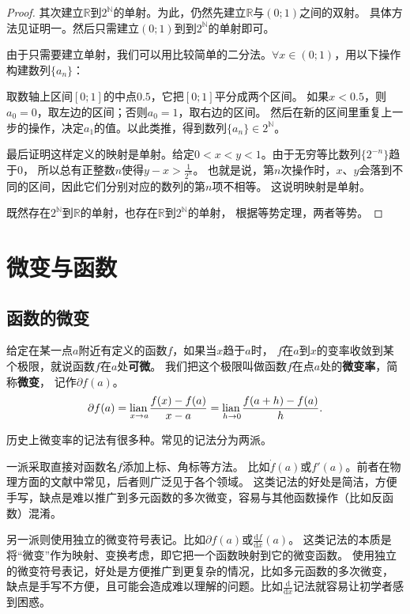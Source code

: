 \documentclass[12pt,UTF8]{ctexbook}
\begin{document}
\begin{appendix}
\begin{proof}
    其次建立$\mathbb{R}$到$2^\mathbb{N}$的单射。为此，仍然先建立$\mathbb{R}$与$(0;1)$之间的双射。
    具体方法见证明一。然后只需建立$(0;1)$到到$2^\mathbb{N}$的单射即可。

    由于只需要建立单射，我们可以用比较简单的二分法。$\forall x \in (0;1)$，用以下操作构建数列$\{a_n\}$：
    
    取数轴上区间$[0;1]$的中点$0.5$，它把$[0;1]$平分成两个区间。
    如果$x<0.5$，则$a_0=0$，取左边的区间；否则$a_0=1$，取右边的区间。
    然后在新的区间里重复上一步的操作，决定$a_1$的值。以此类推，得到数列$\{a_n\}\in 2^\mathbb{N}$。

    最后证明这样定义的映射是单射。给定$0 < x < y < 1$。由于无穷等比数列$\{2^{-n}\}$趋于$0$，
    所以总有正整数$n$使得$y - x > \frac{1}{2^n}$。
    也就是说，第$n$次操作时，$x$、$y$会落到不同的区间，因此它们分别对应的数列的第$n$项不相等。
    这说明映射是单射。

    既然存在$2^\mathbb{N}$到$\mathbb{R}$的单射，也存在$\mathbb{R}$到$2^\mathbb{N}$的单射，
    根据等势定理，两者等势。

\end{proof}

\chapter{微变与函数}

\section{函数的微变}

\begin{df}\label{df:b-1-0}
给定在某一点$a$附近有定义的函数$f$，如果当$x$趋于$a$时，
$f$在$a$到$x$的变率收敛到某个极限，就说函数$f$在$a$处\textbf{可微}。
我们把这个极限叫做函数$f$在点$a$处的\textbf{微变率}，简称\textbf{微变}，
记作$\partial f(a)$。
$$ \partial f(a) = \underset{x\to a}{\operatorname{lian}\,} \frac{f(x) - f(a)}{x - a} = \underset{h\to 0}{\operatorname{lian}\,} \frac{f(a + h) - f(a)}{h}.$$

历史上微变率的记法有很多种。常见的记法分为两派。

一派采取直接对函数名$f$添加上标、角标等方法。
比如$\dot{f}(a)$或$f'(a)$。前者在物理方面的文献中常见，后者则广泛见于各个领域。
这类记法的好处是简洁，方便手写，缺点是难以推广到多元函数的多次微变，容易与其他函数操作（比如反函数）混淆。

另一派则使用独立的微变符号表记。比如$\partial f(a)$或$\frac{\mathrm{d}f}{\mathrm{d}x}(a)$。
这类记法的本质是将“微变”作为映射、变换考虑，即它把一个函数映射到它的微变函数。
使用独立的微变符号表记，好处是方便推广到更复杂的情况，比如多元函数的多次微变，
缺点是手写不方便，且可能会造成难以理解的问题。比如$\frac{\mathrm{d}}{\mathrm{d}x}$记法就容易让初学者感到困惑。


\end{df}
\end{appendix}
\end{document}
